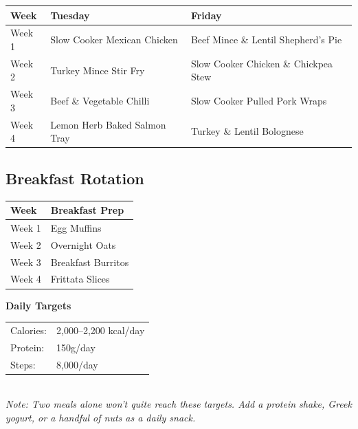 \documentclass[12pt, a4paper]{book}
\begin{document}
\begin{tabularx}{\linewidth}{|l|X|X|}
  \hline
  \rowcolor{primary!20}
  \textbf{Week} & \textbf{Tuesday} & \textbf{Friday} \\
  \hline
  Week 1 & Slow Cooker Mexican Chicken & Beef Mince \& Lentil Shepherd's Pie \\
  \hline
  Week 2 & Turkey Mince Stir Fry & Slow Cooker Chicken \& Chickpea Stew \\
  \hline
  Week 3 & Beef \& Vegetable Chilli & Slow Cooker Pulled Pork Wraps \\
  \hline
  Week 4 & Lemon Herb Baked Salmon Tray & Turkey \& Lentil Bolognese \\
  \hline
\end{tabularx}

\vspace{1cm}

\subsection*{\textcolor{primary}{Breakfast Rotation}}

\begin{tabularx}{\linewidth}{|l|X|}
  \hline
  \rowcolor{primary!20}
  \textbf{Week} & \textbf{Breakfast Prep} \\
  \hline
  Week 1 & Egg Muffins \\
  \hline
  Week 2 & Overnight Oats \\
  \hline
  Week 3 & Breakfast Burritos \\
  \hline
  Week 4 & Frittata Slices \\
  \hline
\end{tabularx}

\vspace{1cm}

\begin{macrobox}
  \textbf{\textcolor{primary}{Daily Targets}} \\[4pt]
  \begin{tabular}{ll}
    Calories: & 2,000--2,200 kcal/day \\
    Protein:  & 150g/day \\
    Steps:    & 8,000/day \\
  \end{tabular}\\[6pt]
  \textit{Note: Two meals alone won't quite reach these targets. Add a protein shake, Greek yogurt, or a handful of nuts as a daily snack.}
\end{macrobox}
\end{document}
